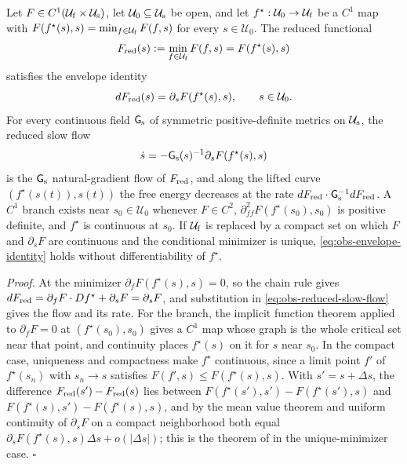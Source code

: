 Let $F\in C^1(\mathcal U_{\rm f}\times\mathcal U_{\rm s})$, let
$\mathcal U_0\subseteq\mathcal U_{\rm s}$ be open, and let
$f^\star:\mathcal U_0\to\mathcal U_{\rm f}$ be a $C^1$ map with
$F(f^\star(s),s)=\min_{f\in\mathcal U_{\rm f}}F(f,s)$ for every $s\in\mathcal U_0$.
The reduced functional
\begin{equation}
F_{\rm red}(s):=\min_{f\in\mathcal U_{\rm f}}F(f,s)=F(f^\star(s),s)
\label{eq:obs-reduced-functional}
\end{equation}
satisfies the envelope identity
\begin{equation}
dF_{\rm red}(s)=\partial_sF(f^\star(s),s),\qquad s\in\mathcal U_0.
\label{eq:obs-envelope-identity}
\end{equation}
For every continuous field $\mathsf G_{\rm s}$ of symmetric positive-definite
metrics on $\mathcal U_{\rm s}$, the reduced slow flow
\begin{equation}
\dot s=-\mathsf G_{\rm s}(s)^{-1}\partial_sF(f^\star(s),s)
\label{eq:obs-reduced-slow-flow}
\end{equation}
is the $\mathsf G_{\rm s}$ natural-gradient flow of $F_{\rm red}$, and along the
lifted curve $(f^\star(s(t)),s(t))$ the free energy decreases at the rate
$dF_{\rm red}\cdot\mathsf G_{\rm s}^{-1}dF_{\rm red}$. A $C^1$ branch exists near
$s_0\in\mathcal U_0$ whenever $F\in C^2$, $\partial^2_{ff}F(f^\star(s_0),s_0)$ is
positive definite, and $f^\star$ is continuous at $s_0$. If $\mathcal U_{\rm f}$ is
replaced by a compact set on which $F$ and $\partial_sF$ are continuous and the
conditional minimizer is unique, \eqref{eq:obs-envelope-identity} holds without
differentiability of $f^\star$. 

\noindent\emph{Proof.}
At the minimizer $\partial_fF(f^\star(s),s)=0$, so the chain rule gives
$dF_{\rm red}=\partial_fF\cdot Df^\star+\partial_sF=\partial_sF$, and substitution in
\eqref{eq:obs-reduced-slow-flow} gives the flow and its rate. For the branch, the
implicit function theorem applied to $\partial_fF=0$ at $(f^\star(s_0),s_0)$ gives a
$C^1$ map whose graph is the whole critical set near that point, and continuity places
$f^\star(s)$ on it for $s$ near $s_0$. In the compact case, uniqueness and compactness
make $f^\star$ continuous, since a limit point $f'$ of $f^\star(s_n)$ with $s_n\to s$
satisfies $F(f',s)\leq F(f^\star(s),s)$. With $s'=s+\Delta s$, the difference
$F_{\rm red}(s')-F_{\rm red}(s)$ lies between
$F(f^\star(s'),s')-F(f^\star(s'),s)$ and $F(f^\star(s),s')-F(f^\star(s),s)$, and by the
mean value theorem and uniform continuity of $\partial_sF$ on a compact neighborhood
both equal $\partial_sF(f^\star(s),s)\Delta s+o(\lvert\Delta s\rvert)$; this is the
theorem of \citet[Ch.~III]{Danskin1967} in the unique-minimizer case. $\square$


